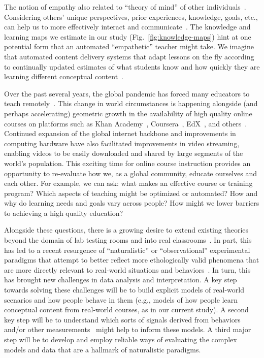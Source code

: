 \documentclass[10pt]{article}
\begin{document}
The notion of empathy also related to ``theory of mind'' of other
individuals~\citep{GoldWinn12, KansEtal15, Melt11}. Considering others' unique
perspectives, prior experiences, knowledge, goals, etc., can help us to more
effectively interact and communicate~\citep{ShaoEtal18, StepBaer06, Ratk18}.
The knowledge and learning maps we estimate in our study
(Fig.~\ref{fig:knowledge-maps}) hint at one potential form that an automated
``empathetic'' teacher might take. We imagine that automated content delivery
systems that adapt lessons on the fly according to continually updated
estimates of what students know and how quickly they are learning different
conceptual content~\citep[e.g., building on ideas such as ][and
others]{AndeSkwa86, Half88, Kuma05, WolzEtal88}.

Over the past several years, the global pandemic has forced many educators to
teach remotely~\citep{MoseEtal21, ShimLee20, KawaEtal21, Whal20}. This change
in world circumstances is happening alongside (and perhaps accelerating)
geometric growth in the availability of high quality online courses on
platforms such as Khan Academy~\citep{Khan04}, Coursera~\citep{Youn12},
EdX~\citep{Kolo13}, and others~\citep{RhoaEtal13}. Continued expansion of the
global internet backbone and improvements in computing hardware have also
facilitated improvements in video streaming, enabling videos to be easily
downloaded and shared by large segments of the world's population. This
exciting time for online course instruction provides an opportunity to
re-evaluate how we, as a global community, educate ourselves and each other.
For example, we can ask: what makes an effective course or training program?
Which aspects of teaching might be optimized or automated? How and why do
learning needs and goals vary across people? How might we lower barriers to
achieving a high quality education?

Alongside these questions, there is a growing desire to extend existing
theories beyond the domain of lab testing rooms and into real
classrooms~\citep{Kauf03}. In part, this has led to a recent resurgence of
``naturalistic'' or ``observational'' experimental paradigms that attempt to
better reflect more ethologically valid phenomena that are more directly
relevant to real-world situations and behaviors~\citep{NastEtal20}. In turn,
this has brought new challenges in data analysis and interpretation. A key step
towards solving these challenges will be to build explicit models of real-world
scenarios and how people behave in them (e.g., models of how people learn
conceptual content from real-world courses, as in our current study). A second
key step will be to understand which sorts of signals derived from behaviors
and/or other measurements~\citep[e.g., neurophysiological data; ][]{NguyEtal22,
MeshEtal20, PoulEtal17, BeviEtal19, DikkEtal17} might help to inform these
models. A third major step will be to develop and employ reliable ways of
evaluating the complex models and data that are a hallmark of naturalistic
paradigms.
\end{document}
